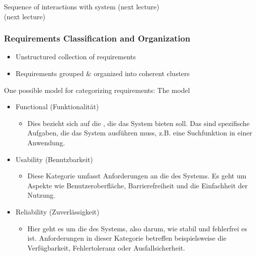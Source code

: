 \begin{defBox}[title=Systematic requirement elicitation: Further Techniques]
     Sequence of interactions with system (next lecture)\\
     (next lecture)
\end{defBox}

\subsubsection*{Requirements Classification and Organization}
\begin{defBox}[title=Classification \& Organization]
    \begin{itemize}
        \item {} Unstructured collection of requirements
        \item {} Requirements grouped \& organized into coherent clusters
    \end{itemize}
    One possible model for categorizing requirements: The  model
    \begin{itemize}
        \item Functional (Funktionalität)
        \begin{infoBox}
            \begin{itemize}
                \item Dies bezieht sich auf die , die das System bieten soll. Das sind spezifische Aufgaben, die das System ausführen muss, z.B. eine Suchfunktion in einer Anwendung.
            \end{itemize}
        \end{infoBox}
        \item Usability (Benutzbarkeit)
        \begin{infoBox}
            \begin{itemize}
                \item Diese Kategorie umfasst Anforderungen an die  des Systems. Es geht um Aspekte wie Benutzeroberfläche, Barrierefreiheit und die Einfachheit der Nutzung.
            \end{itemize}
        \end{infoBox}
        \item Reliability (Zuverlässigkeit)
        \begin{infoBox}
            \begin{itemize}
                \item Hier geht es um die  des Systems, also darum, wie stabil und fehlerfrei es ist. Anforderungen in dieser Kategorie betreffen beispielsweise die Verfügbarkeit, Fehlertoleranz oder Ausfallsicherheit.

\end{itemize}
\end{infoBox}
\end{itemize}
\end{defBox}
